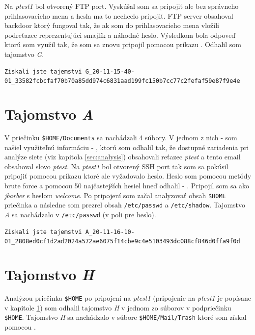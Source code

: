 \documentclass[11pt,a4paper]{article}
\begin{document}
Na \textit{ptest1} bol otvorený FTP port. Vyskúšal som sa pripojiť ale bez správneho prihlasovacieho mena a hesla ma to nechcelo pripojiť. FTP server obsahoval backdoor ktorý fungoval tak, že ak som do prihlasovacieho mena vložili podreťazec \uv{\textit{:)}} reprezentujúci smajlík a náhodné heslo. Výsledkom bola odpoveď  ktorú som využil tak, že som sa znovu pripojil pomocou príkazu . Odhalil som tajomstvo \textit{G}.

\begin{center}
\small{\texttt{Ziskali jste tajemstvi G\_20-11-15-40-01\_33582fcbcfaf70b70a85dd974c6831aad199fc150b7cc77c2fefaf59e87f9e4e}}
\end{center}

\section{Tajomstvo \textit{A}}\label{sec:A}

V priečinku \texttt{\$HOME/Documents} sa nachádzali 4 súbory. V jednom z nich - \texttt{} som našiel využiteľnú informáciu - , ktorú som odhalil tak, že dostupné zariadenia pri analýze siete (viz kapitola \ref{sec:analysis}) obsahovali reťazec \textit{ptest} a tento email obsahoval slovo \textit{ptest}. Na \textit{ptest1} bol otvorený SSH port tak som sa pokúsil pripojiť pomocou príkazu  ktoré ale vyžadovalo heslo. Heslo som pomocou metódy brute force a pomocou 50 najčastejších hesiel hneď odhalil - . Pripojil som sa ako \textit{jbarber} s heslom \textit{welcome}. Po pripojení som začal analyzovať obsah \texttt{\$HOME} priečinka a následne som prezrel obsah \texttt{/etc/passwd} a \texttt{/etc/shadow}. Tajomstvo \textit{A} sa nachádzalo v \texttt{/etc/passwd} (v poli pre heslo).

\begin{center}
\small{\texttt{Ziskali jste tajemstvi A\_20-11-16-10-01\_2808ed0cf1d2ad2024a572ae6075f14cbe9c4e5103493dc088cf846d0ffa9f0d}}
\end{center}

\section{Tajomstvo \textit{H}}\label{sec:H}

Analýzou priečinka \texttt{\$HOME} po pripojení na \textit{ptest1} (pripojenie na \textit{ptest1} je popísane v kapitole \ref{sec:A}) som odhalil tajomstvo \textit{H} v jednom zo súborov v podpriečinku \texttt{\$HOME}. Tajomstvo \textit{H} sa nachádzalo v súbore \texttt{\$HOME/Mail/Trash} ktoré som získal pomocou .
\end{document}
